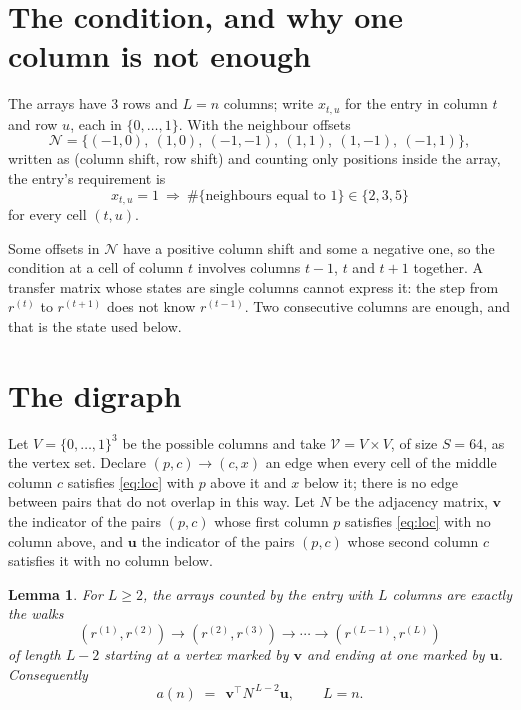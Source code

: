 \documentclass[11pt,a4paper]{article}
\theoremstyle{plain}
\newtheorem{lemma}[theorem]{Lemma}
\theoremstyle{definition}
\begin{document}
\section{The condition, and why one column is not enough}

The arrays have $3$ rows and $L=n$ columns; write $x_{t,u}$ for the entry in
column $t$ and row $u$, each in $\{0,\dots,1\}$. With the neighbour offsets
\[
\mathcal N=\{(-1,0),\ (1,0),\ (-1,-1),\ (1,1),\ (1,-1),\ (-1,1)\},
\]
written as (column shift, row shift) and counting only positions inside the array, the
entry's requirement is
\begin{equation}\label{eq:loc}
x_{t,u}=1\ \Rightarrow\ \#\{\text{neighbours equal to }1\}\in\{2,3,5\}
\end{equation}
for every cell $(t,u)$.

Some offsets in $\mathcal N$ have a positive column shift and some a negative one, so the
condition at a cell of column $t$ involves columns $t-1$, $t$ and $t+1$ together. A transfer
matrix whose states are single columns cannot express it: the step from $r^{(t)}$ to
$r^{(t+1)}$ does not know $r^{(t-1)}$. Two consecutive columns are enough, and that is
the state used below.

\section{The digraph}

Let $V=\{0,\dots,1\}^{3}$ be the possible columns and take
$\mathcal V=V\times V$, of size $S=64$, as the vertex set. Declare $(p,c)\to(c,x)$ an edge
when every cell of the middle column $c$ satisfies \eqref{eq:loc} with $p$ above it and $x$
below it; there is no edge between pairs that do not overlap in this way. Let $N$ be the
adjacency matrix, $\mathbf{v}$ the indicator of the pairs $(p,c)$ whose first column $p$
satisfies \eqref{eq:loc} with no column above, and $\mathbf{u}$ the indicator of
the pairs $(p,c)$ whose second column $c$ satisfies it with no column below.

\begin{lemma}\label{lem:walk}
For $L\ge2$, the arrays counted by the entry with $L$ columns are exactly the walks
\[
(r^{(1)},r^{(2)})\to(r^{(2)},r^{(3)})\to\cdots\to(r^{(L-1)},r^{(L)})
\]
of length $L-2$ starting at a vertex marked by $\mathbf{v}$ and ending at one marked by
$\mathbf{u}$. Consequently
\[
a(n)\;=\;\,\mathbf{v}^{\!\top}N^{\,L-2}\mathbf{u},\qquad L=n .
\]
\end{lemma}
\end{document}
